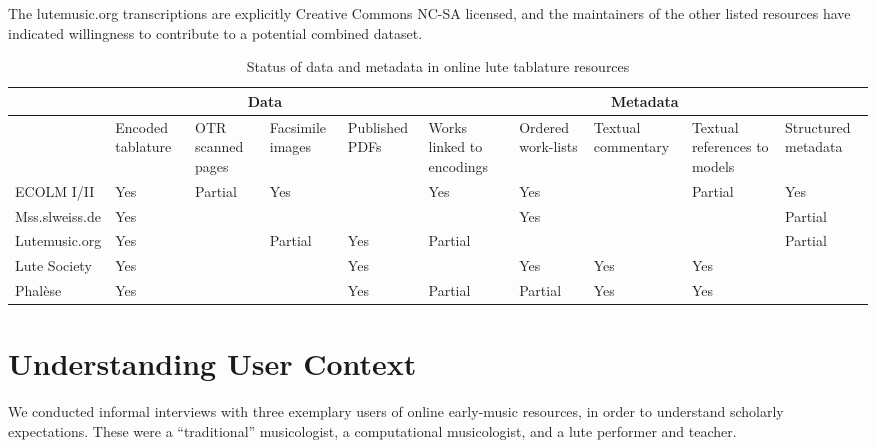 \documentclass[sigconf, nonacm=true]{acmart}
\begin{document}
\begin{sloppypar}
  The lutemusic.org transcriptions are explicitly Creative Commons
  NC-SA licensed, and the maintainers of the other listed resources
  have indicated willingness to contribute to a potential combined
  dataset.
  
  \renewcommand{\arraystretch}{1.2}
  \setlength{\tabcolsep}{4pt}
  
  \begin{table}[t]
  \caption{Status of data and metadata in online lute tablature resources}
  \small
      \begin{tabularx}{\textwidth}{|l|X|X|X|X|X|X|X|X|X|}
        \hline
        & \multicolumn{4}{|c|}{\bf Data} & \multicolumn{5}{|c|}{\bf Metadata} \\
        \hline
        & Encoded tablature & OTR scanned pages & Facsimile images & Published PDFs
        & Works linked to encodings & Ordered work-lists & Textual commentary & Textual references to models & Structured metadata \\
        \hline
            {ECOLM I/II} & Yes & Partial & Yes & & Yes & Yes & & Partial & Yes \\
        \hline
            {Mss.slweiss.de} & Yes & & & & & Yes & & & Partial \\
        \hline
            {Lutemusic.org} & Yes & & Partial & Yes & Partial & & & & Partial \\
        \hline
            {Lute Society} & Yes &  & & Yes & & Yes & Yes & Yes & \\
        \hline
            {Phal\`ese} & Yes & & & Yes & Partial & Partial & Yes & Yes & \\
            \hline
      \end{tabularx}
  \label{table:datasets}
  \end{table}
  
  
  \section{Understanding User Context}\label{user-context}

  We conducted informal interviews with three exemplary users of
  online early-music resources, in order to understand scholarly
  expectations. These were a ``traditional'' musicologist, a
  computational musicologist, and a lute performer and teacher.
  

\end{sloppypar}
\end{document}
